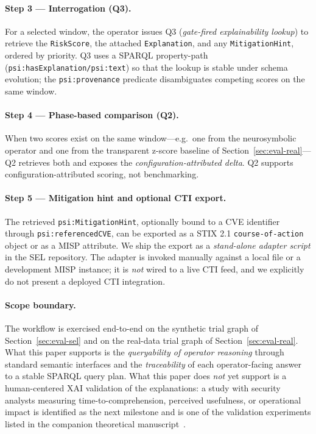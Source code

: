 \documentclass[runningheads]{llncs}
\begin{document}
\paragraph{Step 3 --- Interrogation (Q3).} For a selected window, the
operator issues Q3 (\emph{gate-fired explainability lookup}) to retrieve
the \texttt{RiskScore}, the attached \texttt{Explanation}, and any
\texttt{MitigationHint}, ordered by priority. Q3 uses a SPARQL
property-path (\texttt{psi:hasExplanation/psi:text}) so that the lookup
is stable under schema evolution; the \texttt{psi:provenance} predicate
disambiguates competing scores on the same window.

\paragraph{Step 4 --- Phase-based comparison (Q2).} When two scores
exist on the same window---e.g.\ one from the neurosymbolic operator and
one from the transparent z-score baseline of
Section~\ref{sec:eval-real}---Q2 retrieves both and exposes the
\emph{configuration-attributed delta}. Q2 supports
configuration-attributed scoring, not benchmarking.

\paragraph{Step 5 --- Mitigation hint and optional CTI export.} The
retrieved \texttt{psi:MitigationHint}, optionally bound to a CVE
identifier through \texttt{psi:referencedCVE}, can be exported as a
STIX 2.1 \texttt{course-of-action} object or as a MISP attribute. We
ship the export as a \emph{stand-alone adapter script} in the SEL
repository. The adapter is invoked manually against a local file or a
development MISP instance; it is \emph{not} wired to a live CTI feed,
and we explicitly do not present a deployed CTI integration.

\paragraph{Scope boundary.} The workflow is exercised end-to-end on the
synthetic trial graph of Section~\ref{sec:eval-sel} and on the
real-data trial graph of Section~\ref{sec:eval-real}. What this paper
supports is the \emph{queryability of operator reasoning} through
standard semantic interfaces and the \emph{traceability} of each
operator-facing answer to a stable SPARQL query plan. What this paper
does \emph{not} yet support is a human-centered XAI validation of the
explanations: a study with security analysts measuring
time-to-comprehension, perceived usefulness, or operational impact is
identified as the next milestone and is one of the validation
experiments listed in the companion theoretical
manuscript~\cite{paper5}.
\end{document}
